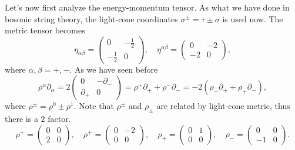 \documentclass[graybox,envcountchap,sectrefs]{svmono}
\begin{document}
Let's now first analyze the energy-momentum tensor. As what we have done in bosonic string theory, the light-cone coordinates $\sigma^{\pm}=\tau\pm \sigma$ is used now.
The metric tensor becomes 
\begin{equation}
\eta_{\alpha\beta}=\left(\begin{array}{cc}
	0 &-\frac{1}{2}\\
	-\frac{1}{2}&0
\end{array}
 \right), \quad \eta^{\alpha\beta}=\left(\begin{array}{cc}
	0&-{2}\\
	-{2}&0
\end{array}
 \right),	
\end{equation}
where $\alpha,\beta=+,-$. As we have seen before
\begin{equation}
\rho^{\alpha}\partial_{\alpha}=	2\left(\begin{array}{cc}
	0 &-\partial_{-}\\
	\partial_{+}& 0
\end{array}
 \right)=\rho^{+}\partial_{+}+\rho^{-}\partial_{-}=-2(\rho_{-}\partial_{+}+\rho_{+}\partial_{-}),
\end{equation}
where $\rho^{\pm}=\rho^{0}\pm \rho^1$. Note that $\rho^{\pm}$ and $\rho_{\pm}$ are related by light-cone metric, thus there is a $2$ factor.
\begin{equation}
\rho^{+}=\left(\begin{array}{cc}
	0 &0\\
	2& 0
\end{array}
 \right),	\quad
 \rho^{+}=\left(\begin{array}{cc}
	0 &-2\\
	0 & 0
\end{array}
 \right),\quad
 \rho_{+}=\left(\begin{array}{cc}
	0 &1\\
	0& 0
\end{array}
 \right),\quad
  \rho_{-}=\left(\begin{array}{cc}
	0 &0\\
	-1& 0
\end{array}
 \right).
\end{equation}
\end{document}
